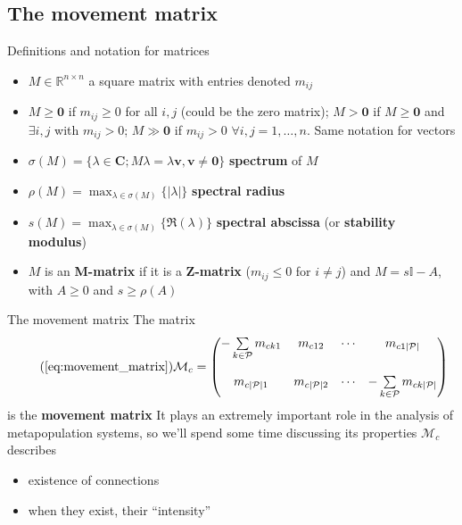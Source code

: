 \documentclass[aspectratio=169]{beamer}\usepackage[]{graphicx}\usepackage[]{xcolor}
\begin{document}
\subsection{The movement matrix}

\begin{frame}{Definitions and notation for matrices}
\begin{itemize}
	\item $M\in\mathbb{R}^{n\times n}$ a square matrix with entries denoted $m_{ij}$
	\vfill
	\item $M\geq\mathbf{0}$ if $m_{ij}\geq 0$ for all $i,j$ (could be the zero matrix); $M>\mathbf{0}$ if $M\geq\mathbf{0}$ and $\exists i,j$ with $m_{ij}>0$; $M\gg\mathbf{0}$ if $m_{ij}>0$ $\forall i,j=1,\ldots,n$. Same notation for vectors
	\vfill
	\item $\sigma(M)=\{\lambda\in\mathbf{C}; M\lambda=\lambda\mathbf{v}, \mathbf{v}\neq\mathbf{0}\}$ \textbf{spectrum} of $M$
	\vfill
	\item $\rho(M)=\max_{\lambda\in\sigma(M)}\{|\lambda|\}$ \textbf{spectral radius}
	\vfill
	\item $s(M)=\max_{\lambda\in\sigma(M)}\{\Re(\lambda)\}$ \textbf{spectral abscissa} (or \textbf{stability modulus})
	\vfill
	\item $M$ is an \textbf{M-matrix} if it is a \textbf{Z-matrix} ($m_{ij}\leq 0$ for $i\neq j$) and $M = s\mathbb{I}-A$, with $A\geq 0$ and $s\geq \rho(A)$
\end{itemize}
\end{frame}

\begin{frame}{The movement matrix}
	The matrix
	\begin{equation}\tag{\ref{eq:movement_matrix}}
		\mathcal{M}_c =
		\begin{pmatrix}
		-\sum\limits_{k\in\P}m_{ck1} & m_{c12} & \cdots & m_{c1|\P|} \\
		& & & \\
		m_{c|\P|1} & m_{c|\P|2} & \cdots & -\sum\limits_{k\in\P}m_{ck|\P|}
		\end{pmatrix}
	\end{equation}
	is the \textbf{movement matrix}
	\vfill
	It plays an extremely important role in the analysis of metapopulation systems, so we'll spend some time discussing its properties
	\vfill
$\mathcal{M}_c$ describes
\begin{itemize} 
\item existence of connections
\item when they exist, their ``intensity''
\end{itemize}
\end{frame}
\end{document}
